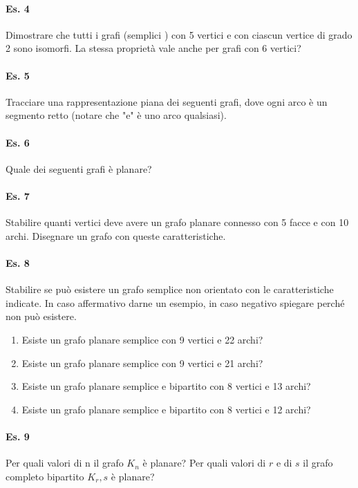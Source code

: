 \paragraph{Es. 4} Dimostrare che tutti i grafi (semplici ) con 5 vertici e con ciascun vertice di grado 2 sono
isomorfi. La stessa proprietà vale anche per grafi con 6 vertici?

\paragraph{Es. 5} Tracciare una rappresentazione piana dei seguenti grafi, dove ogni arco è un segmento retto
(notare che "e" è uno arco qualsiasi).

\paragraph{Es. 6} Quale dei seguenti grafi è planare?

\paragraph{Es. 7} Stabilire quanti vertici deve avere un grafo planare connesso con 5 facce e con 10 archi.
Disegnare un grafo con queste caratteristiche.

\paragraph{Es. 8}Stabilire se può esistere un grafo semplice non orientato con le caratteristiche indicate. In caso affermativo darne un esempio, in caso negativo spiegare perché non può esistere.
\begin{enumerate}
    \item Esiste un grafo planare semplice con 9 vertici e 22 archi?
    \item Esiste un grafo planare semplice con 9 vertici e 21 archi?
    \item Esiste un grafo planare semplice e bipartito con 8 vertici e 13 archi?
    \item Esiste un grafo planare semplice e bipartito con 8 vertici e 12 archi?
\end{enumerate}


\paragraph{Es. 9} Per quali valori di n il grafo $K_n$ è planare? Per quali valori di $r$ e di $s$ il grafo completo bipartito $K_r,s$ è planare?

